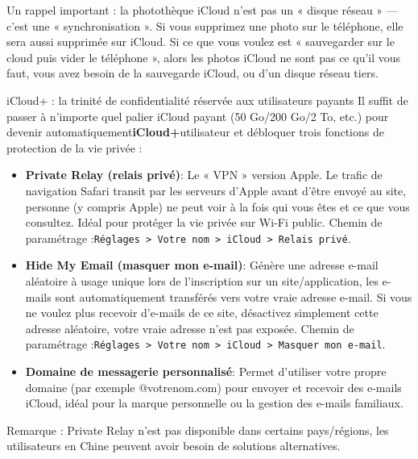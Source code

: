 Un rappel important : la photothèque iCloud n'est pas un « disque réseau » — c'est une « synchronisation ». Si vous supprimez une photo sur le téléphone, elle sera aussi supprimée sur iCloud. Si ce que vous voulez est « sauvegarder sur le cloud puis vider le téléphone », alors les photos iCloud ne sont pas ce qu'il vous faut, vous avez besoin de la sauvegarde iCloud, ou d'un disque réseau tiers.

\begin{tcbinfo}{iCloud+ : la trinité de confidentialité réservée aux utilisateurs payants}
Il suffit de passer à n'importe quel palier iCloud payant (50 Go/200 Go/2 To, etc.) pour devenir automatiquement\textbf{iCloud+}utilisateur et débloquer trois fonctions de protection de la vie privée :

\begin{itemize}
  \item \textbf{Private Relay (relais privé)}: Le « VPN » version Apple. Le trafic de navigation Safari transit par les serveurs d'Apple avant d'être envoyé au site, personne (y compris Apple) ne peut voir à la fois qui vous êtes et ce que vous consultez. Idéal pour protéger la vie privée sur Wi-Fi public. Chemin de paramétrage :\texttt{Réglages > Votre nom > iCloud > Relais privé}.
  \item \textbf{Hide My Email (masquer mon e-mail)}: Génère une adresse e-mail aléatoire à usage unique lors de l'inscription sur un site/application, les e-mails sont automatiquement transférés vers votre vraie adresse e-mail. Si vous ne voulez plus recevoir d'e-mails de ce site, désactivez simplement cette adresse aléatoire, votre vraie adresse n'est pas exposée. Chemin de paramétrage :\texttt{Réglages > Votre nom > iCloud > Masquer mon e-\allowbreak mail}.
  \item \textbf{Domaine de messagerie personnalisé}: Permet d'utiliser votre propre domaine (par exemple @votrenom.com) pour envoyer et recevoir des e-mails iCloud, idéal pour la marque personnelle ou la gestion des e-mails familiaux.
\end{itemize}

Remarque : Private Relay n'est pas disponible dans certains pays/régions, les utilisateurs en Chine peuvent avoir besoin de solutions alternatives.

\end{tcbinfo}

